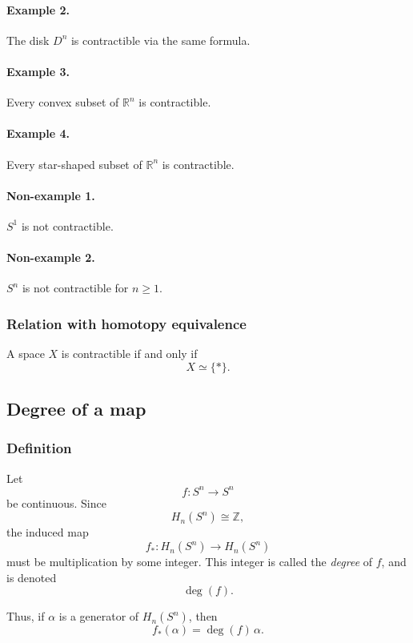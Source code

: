 \documentclass[12pt,a4paper]{article}
\theoremstyle{notespace}
\begin{document}
\paragraph{Example 2.}
The disk \(D^n\) is contractible via the same formula.

\paragraph{Example 3.}
Every convex subset of \(\mathbb R^n\) is contractible.

\paragraph{Example 4.}
Every star-shaped subset of \(\mathbb R^n\) is contractible.

\paragraph{Non-example 1.}
\(S^1\) is not contractible.

\paragraph{Non-example 2.}
\(S^n\) is not contractible for \(n\ge 1\).

\subsubsection*{Relation with homotopy equivalence}

A space \(X\) is contractible if and only if
\[
X\simeq \{*\}.
\]

\subsection{Degree of a map}

\subsubsection*{Definition}

Let
\[
f:S^n\to S^n
\]
be continuous. Since
\[
H_n(S^n)\cong \mathbb Z,
\]
the induced map
\[
f_*:H_n(S^n)\to H_n(S^n)
\]
must be multiplication by some integer. This integer is called the \emph{degree} of \(f\), and is denoted
\[
\deg(f).
\]

Thus, if \(\alpha\) is a generator of \(H_n(S^n)\), then
\[
f_*(\alpha)=\deg(f)\,\alpha.
\]
\end{document}
